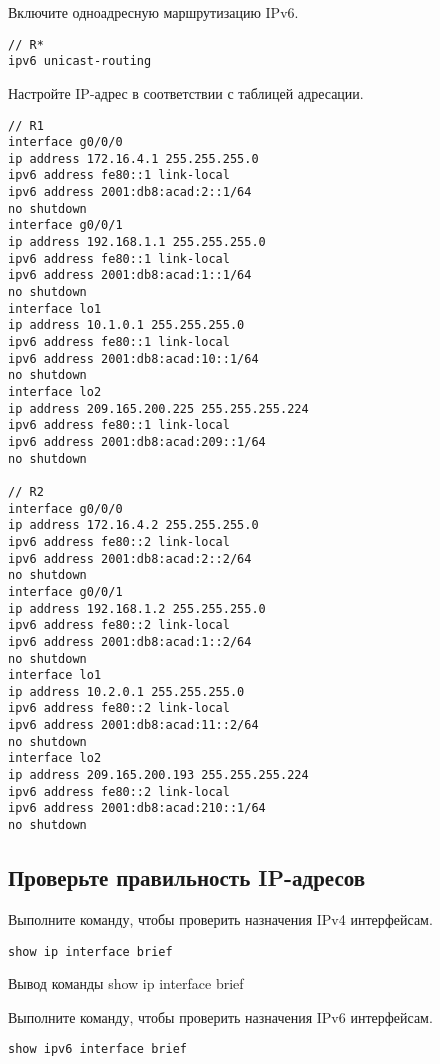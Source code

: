 Включите одноадресную маршрутизацию IPv6.

\begin{verbatim}
// R*
ipv6 unicast-routing
\end{verbatim}

Настройте IP-адрес в соответствии с таблицей адресации.

\begin{verbatim}
// R1
interface g0/0/0
ip address 172.16.4.1 255.255.255.0
ipv6 address fe80::1 link-local
ipv6 address 2001:db8:acad:2::1/64
no shutdown
interface g0/0/1
ip address 192.168.1.1 255.255.255.0
ipv6 address fe80::1 link-local
ipv6 address 2001:db8:acad:1::1/64
no shutdown
interface lo1
ip address 10.1.0.1 255.255.255.0
ipv6 address fe80::1 link-local
ipv6 address 2001:db8:acad:10::1/64
no shutdown
interface lo2
ip address 209.165.200.225 255.255.255.224
ipv6 address fe80::1 link-local
ipv6 address 2001:db8:acad:209::1/64
no shutdown

// R2
interface g0/0/0
ip address 172.16.4.2 255.255.255.0
ipv6 address fe80::2 link-local
ipv6 address 2001:db8:acad:2::2/64
no shutdown
interface g0/0/1
ip address 192.168.1.2 255.255.255.0
ipv6 address fe80::2 link-local
ipv6 address 2001:db8:acad:1::2/64
no shutdown
interface lo1
ip address 10.2.0.1 255.255.255.0
ipv6 address fe80::2 link-local
ipv6 address 2001:db8:acad:11::2/64
no shutdown
interface lo2
ip address 209.165.200.193 255.255.255.224
ipv6 address fe80::2 link-local
ipv6 address 2001:db8:acad:210::1/64
no shutdown
\end{verbatim}

\subsection{Проверьте правильность IP-адресов}

Выполните команду, чтобы проверить назначения IPv4 интерфейсам.

\begin{verbatim}
show ip interface brief
\end{verbatim}

\begin{image}
	\caption{Вывод команды show ip interface brief}
\end{image}

Выполните команду, чтобы проверить назначения IPv6 интерфейсам.

\begin{verbatim}
show ipv6 interface brief
\end{verbatim}

